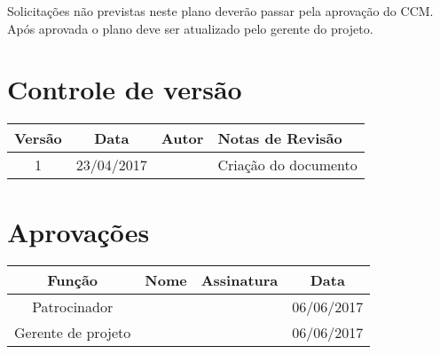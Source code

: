Solicitações não previstas neste plano deverão passar pela aprovação do CCM. Após aprovada o plano deve ser atualizado pelo gerente do projeto.

\section{Controle de versão}

\begin{table}[H]
	\begin{tabularx}{\textwidth}{| c | c | X | X |}
		\hline
		\textbf{Versão} & \textbf{Data} & \textbf{Autor}        & \textbf{Notas de Revisão} \\
		\hline
		1                & 23/04/2017    & \projectManagerName{} & Criação do documento     \\
		\hline
	\end{tabularx}
	\centering
\end{table}

\section{Aprovações}

\begin{table}[H]
	\begin{tabularx}{\textwidth}{| c | c | X | c |}
		\hline
		\textbf{Função}  & \textbf{Nome}         & \textbf{Assinatura}        & \textbf{Data} \\
		\hline
		Patrocinador       & \projectSponsorName{} & \projectSponsorSignature{} & 06/06/2017    \\
		\hline
		Gerente de projeto & \projectManagerName{} & \projectManagerSignature{} & 06/06/2017    \\
		\hline
	\end{tabularx}
	\centering
\end{table}